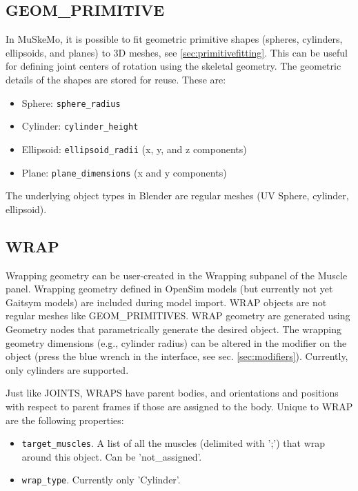 \documentclass{article}
\begin{document}
\subsection{GEOM\_PRIMITIVE}

In MuSkeMo, it is possible to fit geometric primitive shapes (spheres, cylinders, ellipsoids, and planes) to 3D meshes, see \ref{sec:primitivefitting}. This can be useful for defining joint centers of rotation using the skeletal geometry. The geometric details of the shapes are stored for reuse. These are:

\begin{itemize}
    \item Sphere: \texttt{sphere\_radius}
    \item Cylinder: \texttt{cylinder\_height}
    \item Ellipsoid: \texttt{ellipsoid\_radii} (x, y, and z components)
    \item Plane: \texttt{plane\_dimensions} (x and y components)
\end{itemize}

The underlying object types in Blender are regular meshes (UV Sphere, cylinder, ellipsoid).

\subsection{WRAP}
\label{sec:wrapgeom}

Wrapping geometry can be user-created in the Wrapping subpanel of the Muscle panel. Wrapping geometry defined in OpenSim models (but currently not yet Gaitsym models) are included during model import. WRAP objects are not regular meshes like GEOM\_PRIMITIVES. WRAP geometry are generated using Geometry nodes that parametrically generate the desired object. The wrapping geometry dimensions (e.g., cylinder radius) can be altered in the modifier on the object (press the blue wrench in the interface, see sec. \ref{sec:modifiers}). Currently, only cylinders are supported.

Just like JOINTS, WRAPS have parent bodies, and orientations and positions with respect to parent frames if those are assigned to the body. Unique to WRAP are the following properties:

\begin{itemize}
    \item \texttt{target\_muscles}. A list of all the muscles (delimited with ';') that wrap around this object. Can be 'not\_assigned'.
    \item \texttt{wrap\_type}. Currently only 'Cylinder'.
\end{itemize}
 
\end{document}
